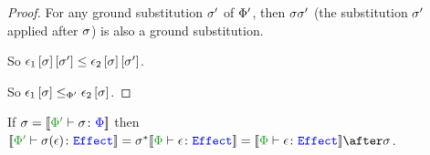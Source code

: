 \documentclass{report}
\begin{document}
\begin{framed}  
    \begin{proof}
        For any ground substitution $\si'$ of $\P'$, then $\si\si'$ (the substitution $\si'$ applied after $\si$) is also a ground substitution.
        
        So $\e_1\ssi\sub{\si'}\subeffect\e_2\ssi\sub{\si'}$. 
        
        So $\e_1\ssi\subeffect_{\P'}\e_2\ssi$.
        
    \end{proof}
\end{framed}

\begin{theorem}
    If $\si = \deno{\typerelation{\P'}{\si}{\P}}$ then $\deno{\typerelation{\P'}{\si(\e)}{\effect}} = \si\star\deno{\typerelation{\P}{\e}{\effect}} = \deno{\typerelation{\P}{\e}{\effect}}\after\si$.
    
\end{theorem}
\end{document}
